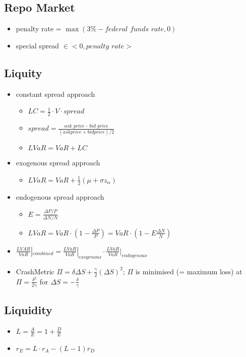 \subsection{Repo Market}
\begin{itemize}
	\item penalty rate = $\max(3\% - \textit{federal funds rate}, 0)$
	\item special spread $\in <0, \textit{penalty rate}>$
\end{itemize}

\subsection{Liquity}
\begin{itemize}
	\item constant spread approach
	\begin{itemize}
		\item $LC = \frac{1}{2} \cdot V \cdot spread$
		\item $spread = \frac{\textit{ask price - bid price}}{(ask price + bid price) / 2}$
		\item $LVaR = VaR + LC$
	\end{itemize}
	\item exogenous spread approach
	\begin{itemize}
		\item $LVaR = VaR + \frac{1}{2}(\mu + \sigma z_{\alpha})$
	\end{itemize}
	\item endogenous spread approach
	\begin{itemize}
		\item $E = \frac{\Delta P / P}{\Delta N / N}$
		\item $LVaR = VaR \cdot \left(1 - \frac{\Delta P}{P} \right) = VaR \cdot \left(1 - E\frac{\Delta N}{N}\right)$
	\end{itemize}
	\item $\frac{LVAR}{VaR}|_{combined} = \frac{LVaR}{VaR}|_{exogenous} \cdot \frac{LVaR}{VaR}|_{endogenous}$
	\item CrashMetric $\Pi = \delta \Delta S + \frac{\gamma}{2}(\Delta S)^2$; $\Pi$ is minimised (= maximum loss) at $\Pi = \frac{\delta^2}{2 \gamma}$ for $\Delta S = - \frac{\delta}{\gamma}$
\end{itemize}

\subsection{Liquidity}
\begin{itemize}
	\item $L = \frac{A}{E} = 1 + \frac{D}{E}$
	\item $r_E = L \cdot {r_A} - (L - 1) r_D$
\end{itemize}

